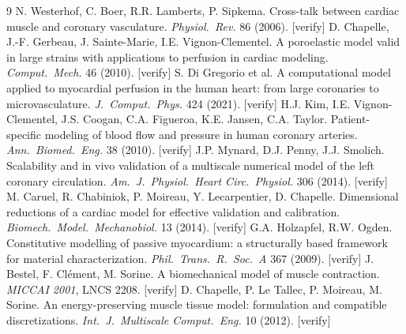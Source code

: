 \documentclass[11pt,a4paper]{article}
\begin{document}
\begin{thebibliography}{9}
 N. Westerhof, C. Boer, R.R. Lamberts, P. Sipkema. Cross-talk between cardiac muscle and coronary vasculature. \emph{Physiol.\ Rev.} 86 (2006). [verify]
 D. Chapelle, J.-F. Gerbeau, J. Sainte-Marie, I.E. Vignon-Clementel. A poroelastic model valid in large strains with applications to perfusion in cardiac modeling. \emph{Comput.\ Mech.} 46 (2010). [verify]
 S. Di Gregorio et al. A computational model applied to myocardial perfusion in the human heart: from large coronaries to microvasculature. \emph{J.\ Comput.\ Phys.} 424 (2021). [verify]
 H.J. Kim, I.E. Vignon-Clementel, J.S. Coogan, C.A. Figueroa, K.E. Jansen, C.A. Taylor. Patient-specific modeling of blood flow and pressure in human coronary arteries. \emph{Ann.\ Biomed.\ Eng.} 38 (2010). [verify]
 J.P. Mynard, D.J. Penny, J.J. Smolich. Scalability and in vivo validation of a multiscale numerical model of the left coronary circulation. \emph{Am.\ J.\ Physiol.\ Heart Circ.\ Physiol.} 306 (2014). [verify]
 M. Caruel, R. Chabiniok, P. Moireau, Y. Lecarpentier, D. Chapelle. Dimensional reductions of a cardiac model for effective validation and calibration. \emph{Biomech.\ Model.\ Mechanobiol.} 13 (2014). [verify]
 G.A. Holzapfel, R.W. Ogden. Constitutive modelling of passive myocardium: a structurally based framework for material characterization. \emph{Phil.\ Trans.\ R.\ Soc.\ A} 367 (2009). [verify]
 J. Bestel, F. Cl\'ement, M. Sorine. A biomechanical model of muscle contraction. \emph{MICCAI 2001}, LNCS 2208. [verify]
 D. Chapelle, P. Le Tallec, P. Moireau, M. Sorine. An energy-preserving muscle tissue model: formulation and compatible discretizations. \emph{Int.\ J.\ Multiscale Comput.\ Eng.} 10 (2012). [verify]
\end{thebibliography}
\end{document}
